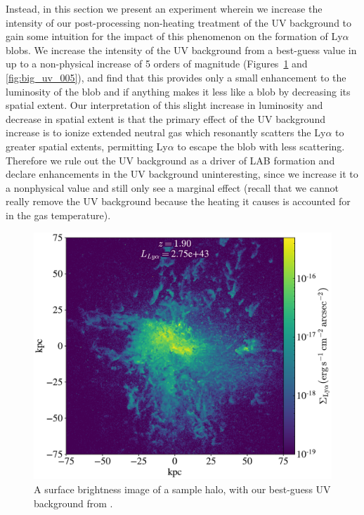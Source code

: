 Instead, in this section we present an experiment wherein we increase the intensity of our post-processing non-heating treatment of the UV background to gain some intuition for the impact of this phenomenon on the formation of Ly$\alpha$ blobs.
We increase the intensity of the UV background from a best-guess value  in \citet{Faucher-Giguere2009} up to a non-physical increase of 5 orders of magnitude (Figures~\ref{fig:big_uv_000} and \ref{fig:big_uv_005}), and find that this provides only a small enhancement to the luminosity of the blob and if anything makes it less like a blob by decreasing its spatial extent.
Our interpretation of this slight increase in luminosity and decrease in spatial extent is that the primary effect of the UV background increase is to ionize extended neutral gas which resonantly scatters the Ly$\alpha$ to greater spatial extents, permitting Ly$\alpha$ to escape the blob with less scattering.
Therefore we rule out the UV background as a driver of LAB formation and declare enhancements in the UV background uninteresting, since we increase it to a nonphysical value and still only see a marginal effect (recall that we cannot really remove the UV background because the heating it causes is accounted for in the gas temperature).


\begin{figure}
    \centering
    \includegraphics[width=\textwidth,keepaspectratio]{figures/big_uvb_000.pdf}
    \caption{
        A surface brightness image of a sample halo, with our best-guess  UV background from \citet{Faucher-Giguere2009}.
    }
  \label{fig:big_uv_000}
\end{figure}


